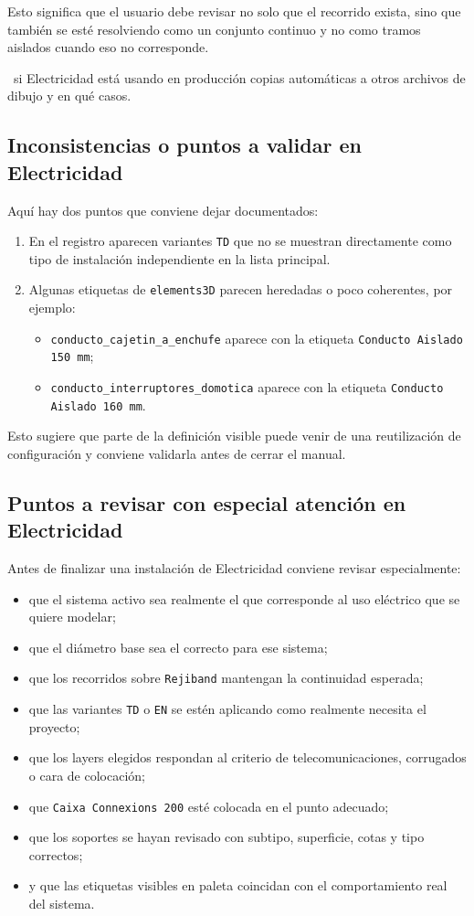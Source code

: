 Esto significa que el usuario debe revisar no solo que el recorrido exista, sino que también se esté resolviendo como un conjunto continuo y no como tramos aislados cuando eso no corresponde.

\pendingtag\ si Electricidad está usando en producción copias automáticas a otros archivos de dibujo y en qué casos.

\subsection{Inconsistencias o puntos a validar en Electricidad}

Aquí hay dos puntos que conviene dejar documentados:

\begin{enumerate}
\item En el registro aparecen variantes \texttt{TD} que no se muestran directamente como tipo de instalación independiente en la lista principal.
\item Algunas etiquetas de \texttt{elements3D} parecen heredadas o poco coherentes, por ejemplo:
\begin{itemize}
\item \texttt{conducto\_cajetin\_a\_enchufe} aparece con la etiqueta \texttt{Conducto Aislado 150 mm};
\item \texttt{conducto\_interruptores\_domotica} aparece con la etiqueta \texttt{Conducto Aislado 160 mm}.
\end{itemize}
\end{enumerate}

Esto sugiere que parte de la definición visible puede venir de una reutilización de configuración y conviene validarla antes de cerrar el manual.

\subsection{Puntos a revisar con especial atención en Electricidad}

Antes de finalizar una instalación de Electricidad conviene revisar especialmente:

\begin{itemize}
\item que el sistema activo sea realmente el que corresponde al uso eléctrico que se quiere modelar;
\item que el diámetro base sea el correcto para ese sistema;
\item que los recorridos sobre \texttt{Rejiband} mantengan la continuidad esperada;
\item que las variantes \texttt{TD} o \texttt{EN} se estén aplicando como realmente necesita el proyecto;
\item que los layers elegidos respondan al criterio de telecomunicaciones, corrugados o cara de colocación;
\item que \texttt{Caixa Connexions 200} esté colocada en el punto adecuado;
\item que los soportes se hayan revisado con subtipo, superficie, cotas y tipo correctos;
\item y que las etiquetas visibles en paleta coincidan con el comportamiento real del sistema.
\end{itemize}

